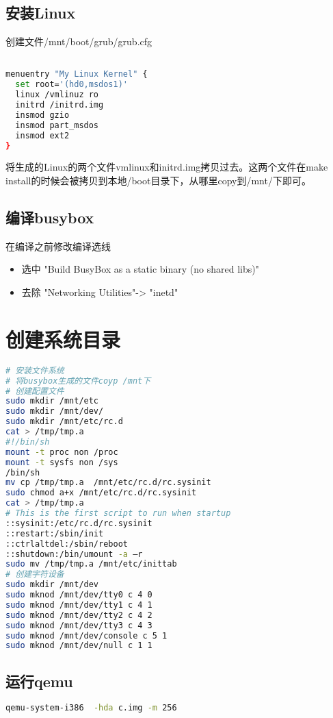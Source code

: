 \documentclass[b5paper,9pt,twoside,openany]{article}
\begin{document}
\subsection{安装Linux}
创建文件/mnt/boot/grub/grub.cfg
\begin{lstlisting}[language=bash]

menuentry "My Linux Kernel" {
  set root='(hd0,msdos1)'
  linux /vmlinuz ro
  initrd /initrd.img
  insmod gzio
  insmod part_msdos
  insmod ext2
}
\end{lstlisting}

将生成的Linux的两个文件vmlinux和initrd.img拷贝过去。这两个文件在make install的时候会被拷贝到本地/boot目录下，从哪里copy到/mnt/下即可。

\subsection{编译busybox}
在编译之前修改编译选线
\begin{itemize}
\item 选中 "Build BusyBox as a static binary (no shared libs)"
\item 去除 "Networking Utilities"-> "inetd"
\end{itemize}
\section{创建系统目录}
\begin{lstlisting}[language=bash]
# 安装文件系统
# 将busybox生成的文件coyp /mnt下
# 创建配置文件
sudo mkdir /mnt/etc
sudo mkdir /mnt/dev/
sudo mkdir /mnt/etc/rc.d
cat > /tmp/tmp.a
#!/bin/sh
mount -t proc non /proc
mount -t sysfs non /sys
/bin/sh
mv cp /tmp/tmp.a  /mnt/etc/rc.d/rc.sysinit
sudo chmod a+x /mnt/etc/rc.d/rc.sysinit
cat > /tmp/tmp.a
# This is the first script to run when startup
::sysinit:/etc/rc.d/rc.sysinit
::restart:/sbin/init
::ctrlaltdel:/sbin/reboot
::shutdown:/bin/umount -a –r
sudo mv /tmp/tmp.a /mnt/etc/inittab
# 创建字符设备
sudo mkdir /mnt/dev
sudo mknod /mnt/dev/tty0 c 4 0
sudo mknod /mnt/dev/tty1 c 4 1
sudo mknod /mnt/dev/tty2 c 4 2
sudo mknod /mnt/dev/tty3 c 4 3
sudo mknod /mnt/dev/console c 5 1
sudo mknod /mnt/dev/null c 1 1
\end{lstlisting}

\subsection{运行qemu}
\begin{lstlisting}[language=bash]
qemu-system-i386  -hda c.img -m 256
\end{lstlisting}
\end{document}

